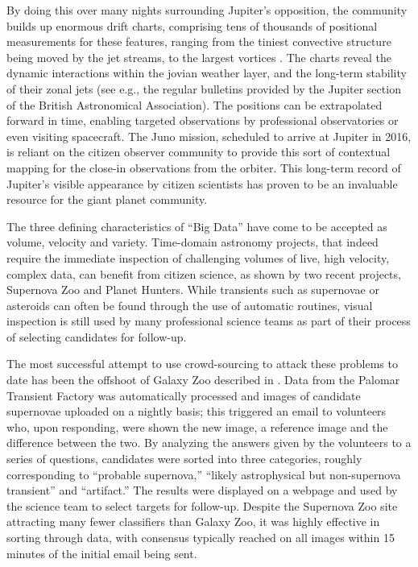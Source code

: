 \documentclass{ar2e}
\def\CaseStudy#1{\noindent{\it\bf #1 \,\,\,\,}}
\begin{document}
By doing this over many nights surrounding Jupiter's opposition, the community
builds up enormous drift charts, comprising tens of thousands of positional
measurements for these features, ranging from the tiniest convective structure
being moved by the jet streams, to the largest vortices
\citep[e.g.][]{WinJUPOSRedSpot}.  The charts reveal the dynamic interactions
within the jovian weather layer, and the long-term stability of their zonal jets
(see e.g., the regular bulletins provided by the Jupiter section of the British
Astronomical Association). The positions can be extrapolated forward in time,
enabling targeted observations by professional observatories or even visiting
spacecraft. The Juno mission, scheduled to arrive at Jupiter in 2016, is reliant
on the citizen observer community to provide this sort of contextual mapping for
the close-in observations from the orbiter.  This long-term record of Jupiter's
visible appearance by citizen scientists has proven to be an  invaluable
resource for the giant planet community.


\CaseStudy{Time domain astronomy: Supernova Zoo and Planet Hunters}  
\label{SNZoo} 
The three defining characteristics of ``Big Data'' have come to be accepted as
volume, velocity and variety.  Time-domain astronomy projects, that indeed
require the immediate inspection of challenging volumes of live, high velocity,
complex data, can benefit from citizen science, as shown by two recent projects,
Supernova Zoo and Planet Hunters.   While transients such as supernovae or
asteroids can often be found through the use of automatic routines, visual
inspection is still used by many professional science teams as part of their
process of selecting candidates for follow-up. 

The most successful attempt to use crowd-sourcing to attack these problems to
date has been the offshoot of Galaxy Zoo described in \citet{SmithSN}.  Data
from the Palomar Transient Factory \citep{LawPTF} was automatically processed
and images of candidate supernovae uploaded on a nightly basis; this triggered
an email to volunteers who, upon responding, were shown the new image, a
reference image and the difference between the two. By analyzing the answers
given by the volunteers to a series of questions, candidates were sorted into 
three categories, roughly corresponding to ``probable supernova,'' ``likely
astrophysical but non-supernova transient'' and ``artifact.'' The results were
displayed on a webpage and used by the science team to select targets for
follow-up. Despite the Supernova Zoo site attracting many fewer classifiers 
than Galaxy Zoo, it was highly effective in sorting through data,  with
consensus typically reached on all images within 15 minutes of the initial email
being sent. 
\end{document}
